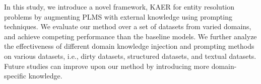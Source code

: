 
In this study, we introduce a novel framework, KAER for entity resolution problems by augmenting PLMS with external knowledge using prompting techniques. We evaluate our method over a set of datasets from varied domains, and achieve competing performance than the baseline models. We further analyze the effectiveness of different domain knowledge injection and prompting methods on various datasets, i.e., dirty datasets, structured datasets, and textual datasets.
Future studies can improve upon our method by introducing more domain-specific knowledge. 